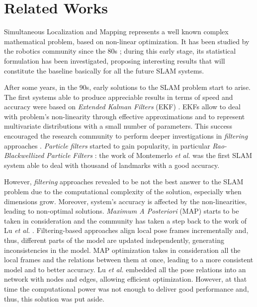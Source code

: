 \chapter{Related Works}\label{ch:related}
\lettrine[lines=2]{S}{}imultaneous Localization and Mapping represents a well known complex mathematical problem, based on non-linear optimization. It has been studied by the robotics community since the 80s \cite{durrant2006simultaneous} \cite{bailey2006simultaneous}; during this early stage, its statistical formulation has been investigated, proposing interesting results that will constitute the baseline basically for all the future SLAM systems.

After some years, in the 90s, early solutions to the SLAM problem start to arise. The first systems able to produce appreciable results in terms of speed and accuracy were based on \textit{Extended Kalman Filters} (EKF) \cite{leonard1990dynamic} \cite{dissanayake2001solution}. EKFs allow to deal with problem's non-linearity through effective approximations and to represent multivariate distributions with a small number of parameters. This success encouraged the research community to perform deeper investigations in \textit{filtering} approaches \cite{aulinas2008filtering_review}. \textit{Particle filters} started to gain popularity, in particular \textit{Rao-Blackwellized Particle Filters} \cite{grisetti2005improving}: the work of Montemerlo \textit{et al.} \cite{montemerlo2002fastslam} was the first SLAM system able to deal with thousand of landmarks with a good accuracy. 

However, \textit{filtering} approaches revealed to be not the best answer to the SLAM problem due to the computational complexity of the solution, especially when dimensions grow. Moreover, system's accuracy is affected by the non-linearities, leading to non-optimal solutions. \textit{Maximum A Posteriori} (MAP) starts to be taken in consideration and the community has taken a step back to the work of Lu \textit{et al.} \cite{lu1997globally}. Filtering-based approaches align local pose frames incrementally and, thus, different parts of the model are updated independently, generating inconsistencies in the model. MAP optimization takes in consideration all the local frames and the relations between them at once, leading to a more consistent model and to better accuracy. Lu \textit{et al.} embedded all the pose relations into an network with nodes and edges, allowing efficient optimization. However, at that time the computational power was not enough to deliver good performance and, thus, this solution was put aside.

